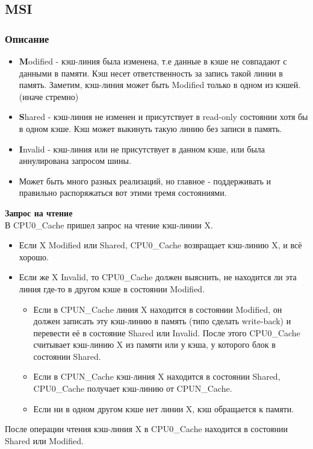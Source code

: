 \documentclass[12pt, a4paper]{article}
\begin{document}
\subsection{MSI}
\subsubsection{Описание}
\begin{itemize}
    \item \textbf{M}odified - кэш-линия была изменена, т.е данные в кэше не совпадают с данными в памяти. Кэш несет ответственность за запись такой линии в память. Заметим, кэш-линия может быть Modified только в одном из кэшей. (иначе стремно) 
    \item \textbf{S}hared - кэш-линия не изменен и присутствует в read-only состоянии хотя бы в одном кэше. Кэш может выкинуть такую линию без записи в память.
    \item \textbf{I}nvalid - кэш-линия или не присутствует в данном кэше, или была аннулирована запросом шины.
    \item Может быть много разных реализаций, но главное - поддерживать и правильно распоряжаться вот этими тремя состояниями.
\end{itemize}
\textbf{Запрос на чтение}\\
В CPU0\_Cache пришел запрос на чтение кэш-линии X.
\begin{itemize}
    \item Если X Modified или Shared, CPU0\_Cache возвращает кэш-линию X, и всё хорошо.
    \item Если же X Invalid, то CPU0\_Cache должен выяснить, не находится ли эта линия где-то в другом кэше в состоянии Modified.
    \begin{itemize}
        \item Если в CPUN\_Cache линия X находится в состоянии Modified, он должен записать эту кэш-линию в память (типо сделать write-back) и перевести её в состояние Shared или Invalid. После этого CPU0\_Cache считывает кэш-линию X из памяти или у кэша, у которого блок в состоянии Shared.
        \item Если в CPUN\_Cache кэш-линия X находится в состоянии Shared, CPU0\_Cache получает кэш-линию от CPUN\_Cache.
        \item Если ни в одном другом кэше нет линии X, кэш обращается к памяти.
    \end{itemize}
\end{itemize}
После операции чтения кэш-линия X в CPU0\_Cache находится в состоянии Shared или Modified.\\
\end{document}
